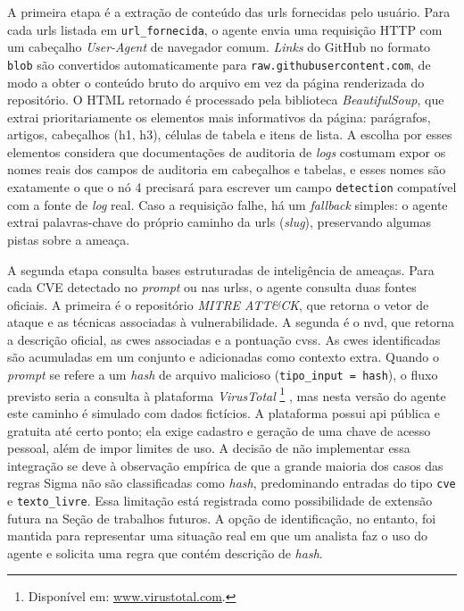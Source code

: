 A primeira etapa é a extração de conteúdo das \gls{url}s fornecidas pelo usuário. 
Para cada \gls{url}s listada em \texttt{url\_fornecida}, o agente envia uma requisição HTTP com um cabeçalho \textit{User-Agent} de navegador comum. 
\textit{Links} do GitHub no formato \texttt{\/blob\/} são convertidos automaticamente para \texttt{raw.githubusercontent.com}, de modo a obter o conteúdo bruto do arquivo em vez da página renderizada do repositório. 
O HTML retornado é processado pela biblioteca \textit{BeautifulSoup}, que extrai prioritariamente os elementos mais informativos da página: parágrafos, artigos, cabeçalhos (h1, h3), células de tabela e itens de lista. 
A escolha por esses elementos considera que documentações de auditoria de \textit{logs} costumam expor os nomes reais dos campos de auditoria em cabeçalhos e tabelas, e esses nomes são exatamente o que o nó 4 precisará para escrever um campo \texttt{detection} compatível com a fonte de \textit{log} real. 
Caso a requisição falhe, há um \textit{fallback} simples: o agente extrai palavras-chave do próprio caminho da \gls{url}s (\textit{slug}), preservando algumas pistas sobre a ameaça.

A segunda etapa consulta bases estruturadas de inteligência de ameaças. 
Para cada CVE detectado no \textit{prompt} ou nas \gls{url}ss, o agente consulta duas fontes oficiais. 
A primeira é o repositório \textit{MITRE ATT\&CK}, que retorna o vetor de ataque e as técnicas associadas à vulnerabilidade. 
A segunda é o \gls{nvd}, que retorna a descrição oficial, as \gls{cwe}s associadas e a pontuação \gls{cvss}. 
As \gls{cwe}s identificadas são acumuladas em um conjunto e adicionadas como contexto extra.
Quando o \textit{prompt} se refere a um \textit{hash} de arquivo malicioso (\texttt{tipo\_input = hash}), o fluxo previsto seria a consulta à plataforma \textit{VirusTotal}
\footnote{Disponível em: \url{www.virustotal.com}.}
, mas nesta versão do agente este caminho é simulado com dados fictícios. 
A plataforma possui \gls{api} pública e gratuita até certo ponto; ela exige cadastro e geração de uma chave de acesso pessoal, além de impor limites de uso. 
A decisão de não implementar essa integração se deve à observação empírica de que a grande maioria dos casos das regras Sigma não são classificadas como \textit{hash}, predominando entradas do tipo \texttt{cve} e \texttt{texto\_livre}. 
Essa limitação está registrada como possibilidade de extensão futura na Seção de trabalhos futuros.
A opção de identificação, no entanto, foi mantida para representar uma situação real em que um analista faz o uso do agente e solicita uma regra que contém descrição de \textit{hash}.

